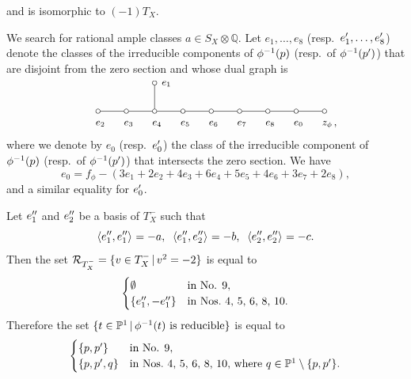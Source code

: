 \documentclass{amsart}
\theoremstyle{plain}
\theoremstyle{definition}
\theoremstyle{remark}
\numberwithin{equation}{section}
\numberwithin{table}{section}
\numberwithin{figure}{section}
\renewcommand{\P}{\mathord{\mathbb  P}}
\newcommand{\Q}{\mathord{\mathbb  Q}}
\newcommand{\RRR}{\mathord{\mathcal R}}
\newcommand{\shortset}[2]{\{ {#1} \,|\, {#2}   \}}
\newcommand{\tensor}{\otimes}
\newcommand{\inv}{\sp{-1}}
\newcommand{\sprime}{\sp\prime}
\newcommand{\spprime}{\sp{\prime\prime}}
\newcommand{\intM}[2]{\langle{#1}\rangle_{#2}}
\newcommand{\Roots}{\RRR}
\begin{document}
 and is isomorphic to $(-1)T_X$.
%
\par
%
We search for  rational ample classes $a\in S_X\tensor\Q$.
Let $e_1, \dots, e_8$ (resp.~$e_1\sprime, \dots, e_8\sprime$)
denote the classes of the irreducible components of $\phi\inv(p)$ (resp.~of $\phi\inv(p\sprime)$)
that are disjoint from the zero section
and whose dual graph is
$$
\def\ha{40}
\def\hav{37}
\def\hd{25}
\def\hdv{22}
\def\he{10}
\def\hev{7}
\setlength{\unitlength}{1.5mm}
\centerline{
{\small
\begin{picture}(105, 9)(-20, 7)
\put(22, 16){\circle{1}}
\put(23.5, 15.5){$e\sb 1$}
\put(22, 10.5){\line(0,1){5}}
\put(9.5, \hev){$e\sb 2$}
\put(15.5, \hev){$e\sb 3$}
\put(21.5, \hev){$e\sb 4$}
\put(27.5, \hev){$e\sb 5$}
\put(33.5, \hev){$e\sb 6$}
\put(39.5, \hev){$e\sb 7$}
\put(45.5, \hev){$e\sb {8}$}
\put(51.5, \hev){$e\sb {0}$}
\put(57.5, \hev){$z_\phi$}
\put(10, \he){\circle{1}}
\put(16, \he){\circle{1}}
\put(22, \he){\circle{1}}
\put(28, \he){\circle{1}}
\put(34, \he){\circle{1}}
\put(40, \he){\circle{1}}
\put(46, \he){\circle{1}}
\put(52, \he){\circle{1}}
\put(58, \he){\circle{1}}
\put(10.5, \he){\line(5, 0){5}}
\put(16.5, \he){\line(5, 0){5}}
\put(22.5, \he){\line(5, 0){5}}
\put(28.5, \he){\line(5, 0){5}}
\put(34.5, \he){\line(5, 0){5}}
\put(40.5, \he){\line(5, 0){5}}
\put(46.5, \he){\line(5, 0){5}}
\put(52.5, \he){\line(5, 0){5}}
\put(60, \hev){,}
\end{picture}
}
}
$$
where we denote by $e_0$
(resp.~$e_0\sprime$)
the class of the irreducible component of 
 $\phi\inv(p)$ (resp.~of $\phi\inv(p\sprime)$)
that intersects the zero section.
We have
$$
e_0=f_{\phi}- (3e_1+ 2e_2+ 4e_3 +6e_4 +5e_5 +4e_6 +3 e_7 +2e_8),
$$
and a similar equality for $e_0\sprime$.
%
\par
Let $e_1\spprime$ and $e_2\spprime$ be a basis of $T_X^-$ such that
$$
\intM{e_1\spprime, e_1\spprime}{}=-a, \;\; \intM{e_1\spprime, e_2\spprime}{}=-b,\;\; \intM{e_2\spprime, e_2\spprime}{}=-c.
$$
Then the set $\Roots_{T_X\sp-}=\shortset{v\in T_X^-}{v^2=-2}$ is equal to
$$
\begin{cases}
\emptyset & \textrm{in No. 9}, \\
\{e_1\spprime, -e_1\spprime\} & \textrm{in Nos.~4, 5, 6, 8, 10}.
\end{cases}
$$
Therefore the set $\shortset{t\in \P^1}{\textrm{$\phi\inv(t)$ is reducible}}$  is equal to 
$$
\begin{cases}
\{ p, p\sprime\} & \textrm{in No. 9}, \\
\{ p, p\sprime, q\}  & \textrm{in Nos.~4, 5, 6, 8, 10, where $q\in \P^1\setminus \{p, p\sprime\}$}.
\end{cases}
$$
\end{document}
